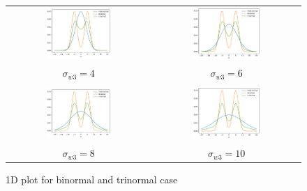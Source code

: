 \begin{figure}
    \centering
    \begin{tabular}{cc}
        \multicolumn{1}{c}{\includegraphics[width=0.48\textwidth]{include/figures/1dplotslw4}} &
        \multicolumn{1}{c}{\includegraphics[width=0.48\textwidth]{include/figures/1dplotslw6}} \\
        $\sigma_{w3} = 4$ & $\sigma_{w3} = 6$  \\ \\
        \multicolumn{1}{c}{\includegraphics[width=0.48\textwidth]{include/figures/1dplotslw8}} &
        \multicolumn{1}{c}{\includegraphics[width=0.48\textwidth]{include/figures/1dplotslw10}} \\
        $\sigma_{w3} = 8$ & $\sigma_{w3} = 10$
    \end{tabular}
    \caption{1D plot for binormal and trinormal case}
    \label{fig:1dplotbitri}
\end{figure}
